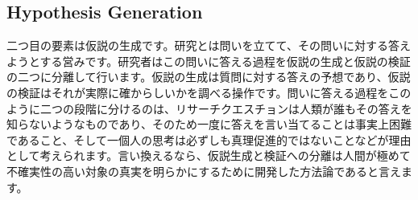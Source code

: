 


\subsection{Hypothesis Generation}
二つ目の要素は仮説の生成です。研究とは問いを立てて、その問いに対する答えようとする営みです。研究者はこの問いに答える過程を仮説の生成と仮説の検証の二つに分離して行います。仮説の生成は質問に対する答えの予想であり、仮説の検証はそれが実際に確からしいかを調べる操作です。問いに答える過程をこのように二つの段階に分けるのは、リサーチクエスチョンは人類が誰もその答えを知らないようなものであり、そのため一度に答えを言い当てることは事実上困難であること、そして一個人の思考は必ずしも真理促進的ではないことなどが理由として考えられます。言い換えるなら、仮説生成と検証への分離は人間が極めて不確実性の高い対象の真実を明らかにするために開発した方法論であると言えます。


